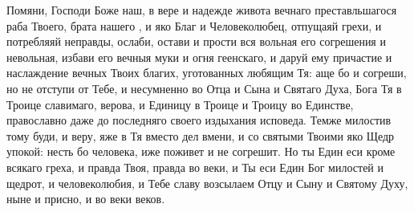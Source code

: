\begin{mymulticols}
Помяни, Господи Боже наш, в вере и надежде живота вечнаго преставльшагося раба Твоего, брата нашего , и яко Благ и Человеколюбец, отпущаяй грехи, и потребляяй неправды, ослаби, остави и прости вся вольная его согрешения и невольная, избави его вечныя муки и огня геенскаго, и даруй ему причастие и наслаждение вечных Твоих благих, уготованных любящим Тя: аще бо и согреши, но не отступи от Тебе, и несумненно во Отца и Сына и Святаго Духа, Бога Тя в Троице славимаго, верова, и Единицу в Троице и Троицу во Единстве, православно даже до последняго своего издыхания исповеда. Темже милостив тому буди, и веру, яже в Тя вместо дел вмени, и со святыми Твоими яко Щедр упокой: несть бо человека, иже поживет и не согрешит. Но ты Един еси кроме всякаго греха, и правда Твоя, правда во веки, и Ты еси Един Бог милостей и щедрот, и человеколюбия, и Тебе славу возсылаем Отцу и Сыну и Святому Духу, ныне и присно, и во веки веков.

\end{mymulticols}

\mychapterending

